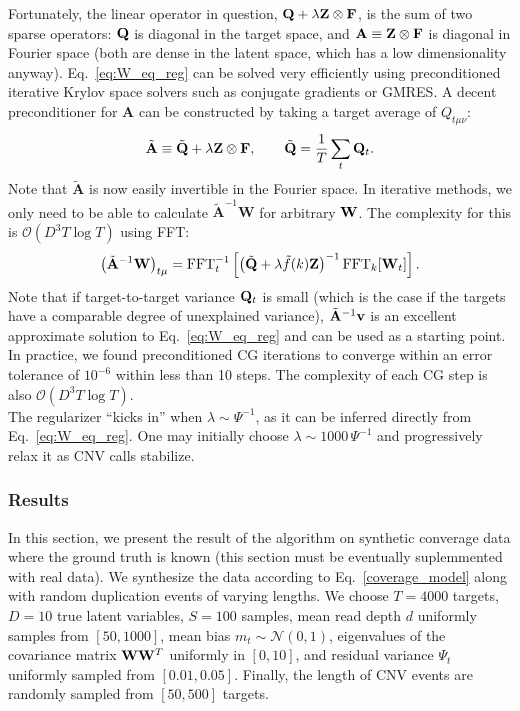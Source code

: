 \documentclass[nofootinbib,amssymb,amsmath]{revtex4}
\newcommand{\vv}{{\bf v}}
\newcommand{\vQ}{{\bf Q}}
\newcommand{\vW}{{\bf W}}
\newcommand{\vF}{{\bf F}}
\newcommand{\vZ}{{\bf Z}}
\newcommand{\norm}{{\mathcal N}}
\begin{document}
Fortunately, the linear operator in question, $\vQ + \lambda \vZ \otimes \vF$, is the sum of two sparse operators: $\vQ$ is diagonal in the target space, and $\mathbf{A} \equiv \vZ \otimes \vF$ is diagonal in Fourier space (both are dense in the latent space, which has a low dimensionality anyway). Eq.~\eqref{eq:W_eq_reg} can be solved very efficiently using preconditioned iterative Krylov space solvers such as conjugate gradients or GMRES. A decent preconditioner for $\mathbf{A}$ can be constructed by taking a target average of $Q_{t\mu\nu}$:
\begin{equation}
\tilde{\mathbf{A}} \equiv \tilde{\vQ} + \lambda \vZ \otimes \vF, \qquad \tilde{\vQ} = \frac{1}{T}\sum_t \vQ_t.
\end{equation}
Note that $\tilde{\mathbf{A}}$ is now easily invertible in the Fourier space. In iterative methods, we only need to be able to calculate $\tilde{\mathbf{A}}^{-1} \mathbf{W}$ for arbitrary $\vW$. The complexity for this is $\mathcal{O}(D^3 T \log T)$ using FFT:
\begin{equation}
\left(\tilde{\mathbf{A}}^{-1} \mathbf{W}\right)_{t\mu} = \mathrm{FFT}_t^{-1}\left[\left(\tilde{\vQ} + \lambda \tilde{f}(k) \vZ\right)^{-1} \mathrm{FFT}_k[\vW_t]\right].
\end{equation}
Note that if target-to-target variance $\vQ_t$ is small (which is the case if the targets have a comparable degree of unexplained variance), $\tilde{\mathbf{A}}^{-1} \vv$ is an excellent approximate solution to Eq.~\eqref{eq:W_eq_reg} and can be used as a starting point. In practice, we found preconditioned CG iterations to converge within an error tolerance of $10^{-6}$ within less than 10 steps. The complexity of each CG step is also $\mathcal{O}(D^3 T \log T)$.\\

 The regularizer ``kicks in'' when $\lambda \sim \Psi^{-1}$, as it can be inferred directly from Eq.~\eqref{eq:W_eq_reg}. One may initially choose $\lambda \sim 1000\,\Psi^{-1}$ and progressively relax it as CNV calls stabilize.

\subsubsection{Results}
In this section, we present the result of the algorithm on synthetic converage data where the ground truth is known (this section must be eventually suplemmented with real data). We synthesize the data according to Eq.~\eqref{coverage_model} along with random duplication events of varying lengths. We choose $T=4000$ targets, $D=10$ true latent variables, $S=100$ samples, mean read depth $d$ uniformly samples from $[50, 1000]$, mean bias $m_t \sim \norm(0, 1)$, eigenvalues of the covariance matrix $\vW \vW^T$ uniformly in $[0, 10]$, and residual variance $\Psi_t$ uniformly sampled from $[0.01, 0.05]$. Finally, the length of CNV events are randomly sampled from $[50, 500]$ targets.\\
\end{document}
